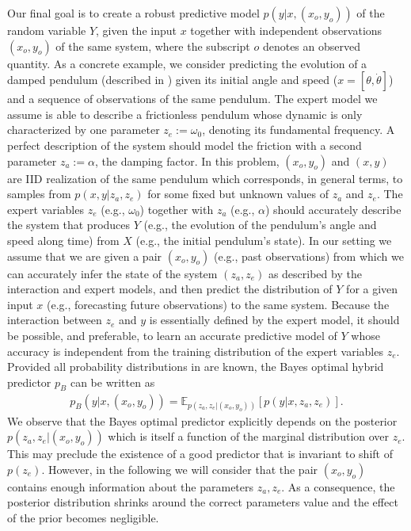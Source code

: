 Our final goal is to create a robust predictive model $p(y|x, (x_o, y_o))$ of the random variable $Y$, given the input $x$ together with independent observations $(x_o, y_o)$ of the same system, where the subscript $o$ denotes an observed quantity. As a concrete example, we consider predicting the evolution of a damped pendulum (described in ) given its initial angle and speed ($x = \left[ \theta, \dot\theta\right]$) and a sequence of observations of the same pendulum. The expert model we assume is able to describe a frictionless pendulum whose dynamic is only characterized by one parameter $z_e := \omega_0$, denoting its fundamental frequency. A perfect description of the system should model the friction with a second parameter $z_a := \alpha$, the damping factor. In this problem, $(x_o, y_o)$ and $(x, y)$ are IID realization of the same pendulum which corresponds, in general terms, to samples from $p(x, y|z_a, z_e)$ for some fixed but unknown values of $z_a$ and $z_e$. The expert variables $z_e$ (e.g., $\omega_0$) together with $z_a$ (e.g., $\alpha$) should accurately describe the system that produces $Y$ (e.g., the evolution of the pendulum's angle and speed along time) from $X$ (e.g., the initial pendulum's state). In our setting we assume that we are given a pair $(x_o, y_o)$ (e.g., past observations) from which we can accurately infer the state of the system $(z_a, z_e)$ as described by the interaction and expert models, and then predict the distribution of $Y$ for a given input $x$ (e.g., forecasting future observations) to the same system. Because the interaction between $z_e$ and $y$ is essentially defined by the expert model, it should be possible, and preferable, to learn an accurate predictive model of $Y$ whose accuracy is independent from the training distribution of the expert variables $z_e$. Provided all probability distributions in  are known, the Bayes optimal hybrid predictor $p_B$ can be written as
\begin{align}
    p_B(y|x, (x_o, y_o)) = \mathbb{E}_{p(z_a, z_e|(x_o, y_o))}\left[ p(y|x, z_a, z_e) \right]. \label{eq:hybrid_predictor}
\end{align}
We observe that the Bayes optimal predictor explicitly depends on the posterior $p(z_a, z_e|(x_o, y_o))$ which is itself a function of the marginal distribution over $z_e$. This may preclude the existence of a good predictor that is invariant to shift of $p(z_e)$. However, in the following we will consider that the pair $(x_o, y_o)$ contains enough information about the parameters $z_a, z_e$. As a consequence, the posterior distribution shrinks around the correct parameters value and the effect of the prior becomes negligible.


